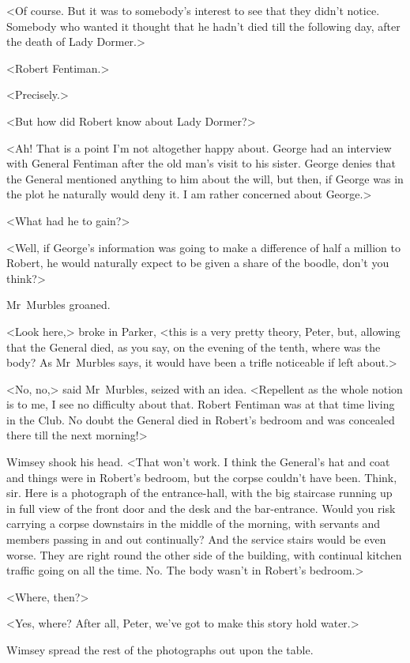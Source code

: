 <Of course. But it was to somebody's interest to see that they didn't notice. Somebody who wanted it thought that he hadn't died till the following day, after the death of Lady Dormer.>

<Robert Fentiman.>

<Precisely.>

<But how did Robert know about Lady Dormer?>

<Ah! That is a point I'm not altogether happy about. George had an interview with General Fentiman after the old man's visit to his sister. George denies that the General mentioned anything to him about the will, but then, if George was in the plot he naturally would deny it. I am rather concerned about George.>

<What had he to gain?>

<Well, if George's information was going to make a difference of half a million to Robert, he would naturally expect to be given a share of the boodle, don't you think?>

Mr~Murbles groaned.

<Look here,> broke in Parker, <this is a very pretty theory, Peter, but, allowing that the General died, as you say, on the evening of the tenth, where was the body? As Mr~Murbles says, it would have been a trifle noticeable if left about.>

<No, no,> said Mr~Murbles, seized with an idea. <Repellent as the whole notion is to me, I see no difficulty about that. Robert Fentiman was at that time living in the Club. No doubt the General died in Robert's bedroom and was concealed there till the next morning!>

Wimsey shook his head. <That won't work. I think the General's hat and coat and things were in Robert's bedroom, but the corpse couldn't have been. Think, sir. Here is a photograph of the entrance-hall, with the big staircase running up in full view of the front door and the desk and the bar-entrance. Would you risk carrying a corpse downstairs in the middle of the morning, with servants and members passing in and out continually? And the service stairs would be even worse. They are right round the other side of the building, with continual kitchen traffic going on all the time. No. The body wasn't in Robert's bedroom.>

<Where, then?>

<Yes, where? After all, Peter, we've got to make this story hold water.>

Wimsey spread the rest of the photographs out upon the table.

